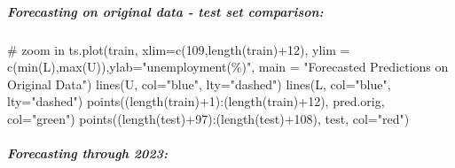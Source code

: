 \documentclass[
  letterpaper,
  DIV=11,
  numbers=noendperiod]{scrartcl}
\let\oldsubparagraph\subparagraph
\renewcommand{\subparagraph}[1]{\oldsubparagraph{#1}\mbox{}}
\newenvironment{Shaded}{\begin{snugshade}}{\end{snugshade}}
\newcommand{\AttributeTok}[1]{\textcolor[rgb]{0.40,0.45,0.13}{#1}}
\newcommand{\CommentTok}[1]{\textcolor[rgb]{0.37,0.37,0.37}{#1}}
\newcommand{\DecValTok}[1]{\textcolor[rgb]{0.68,0.00,0.00}{#1}}
\newcommand{\FunctionTok}[1]{\textcolor[rgb]{0.28,0.35,0.67}{#1}}
\newcommand{\NormalTok}[1]{\textcolor[rgb]{0.00,0.23,0.31}{#1}}
\newcommand{\SpecialCharTok}[1]{\textcolor[rgb]{0.37,0.37,0.37}{#1}}
\newcommand{\StringTok}[1]{\textcolor[rgb]{0.13,0.47,0.30}{#1}}
\begin{document}
\hypertarget{forecasting-on-original-data---test-set-comparison}{%
\subparagraph{Forecasting on original data - test set
comparison:}\label{forecasting-on-original-data---test-set-comparison}}

\begin{Shaded}
\begin{Highlighting}[]
\CommentTok{\# zoom in}
\FunctionTok{ts.plot}\NormalTok{(train, }\AttributeTok{xlim=}\FunctionTok{c}\NormalTok{(}\DecValTok{109}\NormalTok{,}\FunctionTok{length}\NormalTok{(train)}\SpecialCharTok{+}\DecValTok{12}\NormalTok{), }\AttributeTok{ylim =} \FunctionTok{c}\NormalTok{(}\FunctionTok{min}\NormalTok{(L),}\FunctionTok{max}\NormalTok{(U)),}\AttributeTok{ylab=}\StringTok{"unemployment(\%)"}\NormalTok{, }\AttributeTok{main =} \StringTok{"Forecasted Predictions on Original Data"}\NormalTok{)}
\FunctionTok{lines}\NormalTok{(U, }\AttributeTok{col=}\StringTok{"blue"}\NormalTok{, }\AttributeTok{lty=}\StringTok{"dashed"}\NormalTok{)}
\FunctionTok{lines}\NormalTok{(L, }\AttributeTok{col=}\StringTok{"blue"}\NormalTok{, }\AttributeTok{lty=}\StringTok{"dashed"}\NormalTok{)}
\FunctionTok{points}\NormalTok{((}\FunctionTok{length}\NormalTok{(train)}\SpecialCharTok{+}\DecValTok{1}\NormalTok{)}\SpecialCharTok{:}\NormalTok{(}\FunctionTok{length}\NormalTok{(train)}\SpecialCharTok{+}\DecValTok{12}\NormalTok{), pred.orig, }\AttributeTok{col=}\StringTok{"green"}\NormalTok{)}
\FunctionTok{points}\NormalTok{((}\FunctionTok{length}\NormalTok{(test)}\SpecialCharTok{+}\DecValTok{97}\NormalTok{)}\SpecialCharTok{:}\NormalTok{(}\FunctionTok{length}\NormalTok{(test)}\SpecialCharTok{+}\DecValTok{108}\NormalTok{), test, }\AttributeTok{col=}\StringTok{"red"}\NormalTok{)}
\end{Highlighting}
\end{Shaded}

\hypertarget{forecasting-through-2023-1}{%
\subparagraph{Forecasting through
2023:}\label{forecasting-through-2023-1}}
\end{document}
